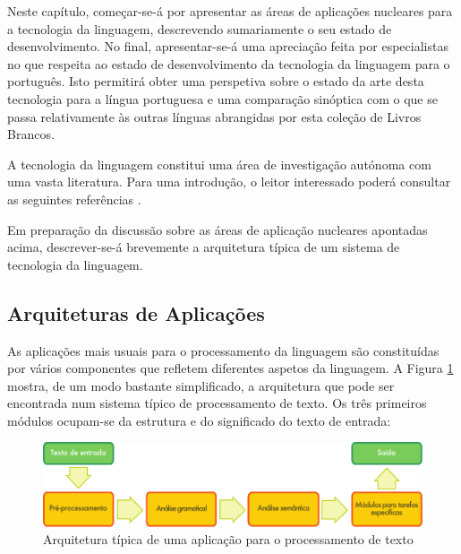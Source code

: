 \begin{multicols}{2}
Neste capítulo, começar-se-á por apresentar as áreas de aplicações nucleares para a tecnologia da linguagem, 
descrevendo sumariamente o seu estado de desenvolvimento. 
No final, apresentar-se-á uma apreciação feita por especialistas no que respeita 
ao estado de desenvolvimento da tecnologia da linguagem para o português.
Isto permitirá obter uma perspetiva sobre o estado da arte desta tecnologia 
para a língua portuguesa e uma comparação sinóptica com o que se passa relativamente 
às outras línguas abrangidas por esta coleção de Livros Brancos.


A tecnologia da linguagem constitui uma área de investigação autónoma com uma vasta literatura. 
Para uma introdução, o leitor interessado poderá consultar as seguintes referências  \cite{jurafsky-martin01, manning-schuetze1, lt-world1, lt-survey1}.

Em preparação da discussão sobre as áreas de aplicação nucleares apontadas acima, 
descrever-se-á brevemente a arquitetura típica de um sistema de tecnologia da linguagem. 

\subsection{Arquiteturas de Aplicações}

 As aplicações mais usuais para o processamento da linguagem são constituídas por vários componentes que refletem diferentes aspetos da linguagem. 
A Figura \ref{fig:textprocessingarch_de} mostra, de um modo bastante simplificado, a arquitetura que pode ser encontrada num sistema típico de processamento de texto. 
Os três primeiros módulos ocupam-se da estrutura e do significado do texto de entrada:

\begin{figure}[htb]
  \center
  \includegraphics[width=\textwidth]{../_media/portuguese/text_processing_app_architecture}
  \caption{Arquitetura típica de uma aplicação para o processamento de texto}
  \label{fig:textprocessingarch_de}
\end{figure}


\end{multicols}
